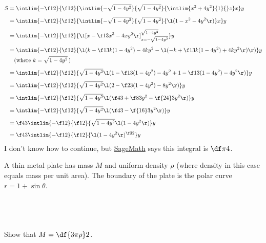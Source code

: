\documentclass[a4paper]{article}
\begin{document}
\begin{align*}
S &= \intlim {-\f12}{\f12} {\intlim {-\sqrt{1 - 4y^2}}{\sqrt{1 - 4y^2}} {\intlim {x^2 + 4y^2}{1} {} z} x} y \\[1ex]
&= \intlim {-\f12}{\f12} {\intlim {-\sqrt{1 - 4y^2}}{\sqrt{1 - 4y^2}} {\l( 1 - x^2 - 4y^2 \r)} x} y \\[1ex]
&= \intlim {-\f12}{\f12} {\l[ x - \f13 x^3 - 4xy^2 \r]_{x = -\sqrt{1 - 4y^2}}^{\sqrt{1 - 4y^2}} } y \\[1ex]
&= \intlim {-\f12}{\f12} {\l( k - \f13 k (1 - 4y^2) - 4k y^2 - \l( -k + \f13 k (1 - 4y^2) + 4k y^2 \r) \r)} y \\
&\quad \text{(where } k = \sqrt{1 - 4y^2}\, \text{)} \\[1ex]
&= \intlim {-\f12}{\f12} {\sqrt{1 - 4y^2} \l( 1 - \f13 (1 - 4y^2) - 4 y^2 + 1 - \f13 (1 - 4y^2) - 4 y^2 \r)} y \\[1ex]
&= \intlim {-\f12}{\f12} {\sqrt{1 - 4y^2} \l( 2 - \f23 (1 - 4y^2) - 8 y^2 \r)} y \\[1ex]
&= \intlim {-\f12}{\f12} {\sqrt{1 - 4y^2} \l( \f43 + \f83 y^2 - \f{24}3 y^2 \r)} y \\[1ex]
&= \intlim {-\f12}{\f12} {\sqrt{1 - 4y^2} \l( \f43 - \f{16}3 y^2 \r)} y \\[1ex]
&= \f43 \intlim {-\f12}{\f12} {\sqrt{1 - 4y^2} \l(1 - 4y^2 \r)} y \\[1ex]
&= \f43 \intlim {-\f12}{\f12} {\l(1 - 4y^2 \r)^{\f32}} y
\end{align*}
I don't know how to continue, but \href{https://www.sagemath.org/}{SageMath} says this integral is $\df\pi4$.


\begin{questionbody}
A thin metal plate has mass $M$ and uniform density $\rho$ (where density in this case equals mass per unit area). The boundary of the plate is the polar curve $r = 1 + \sin \theta$.
\end{questionbody}

\subsection{~} %

\begin{questionbody}
Show that $M = \df{3 \pi \rho}2$.
\end{questionbody}
\end{document}
